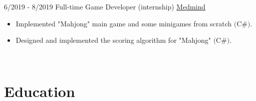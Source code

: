 \documentclass[letterpaper]{twentysecondcv} %
\begin{document}
\begin{twenty}
	\twentyitem
    	{6/2019 - 8/2019}
		{}
        {Full-time Game Developer (internship)}
        {\href{https://www.medmindtechnology.hk}{Medmind}}
        {}
        {\vspace{-2mm}\begin{itemize}[topsep=0pt,partopsep=0pt]
        \item Implemented "Mahjong" main game and some minigames from scratch $($C\#$)$.
        \item Designed and implemented the \textcolor{pblue}{scoring algorithm for "Mahjong"} $($C\#$)$.
    \end{itemize}} \\
        
\end{twenty}

\vspace{-0.25cm}
\section{Education}{\faGraduationCap}
\end{document}
